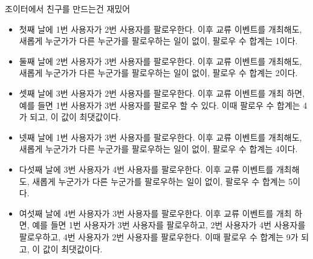 \begin{problem}{조이터에서 친구를 만드는건 재밌어}
\begin{itemize}
\item 첫째 날에 1번 사용자가 2번 사용자를 팔로우한다. 이후 교류 이벤트를 개최해도, 새롭게 누군가가 다른 누군가를 팔로우하는 일이 없이, 팔로우 수 합계는 1이다.
\item 둘째 날에 2번 사용자가 3번 사용자를 팔로우한다. 이후 교류 이벤트를 개최해도, 새롭게 누군가가 다른 누군가를 팔로우하는 일이 없이, 팔로우 수 합계는 2이다.
\item 셋째 날에 3번 사용자가 2번 사용자를 팔로우한다. 이후 교류 이벤트를 개최 하면, 예를 들면 1번 사용자가 3번 사용자를 팔로우 할 수 있다. 이때 팔로우 수 합계는 4가 되고, 이 값이 최댓값이다.
\item 넷째 날에 1번 사용자가 3번 사용자를 팔로우한다. 이후 교류 이벤트를 개최해도, 새롭게 누군가가 다른 누군가를 팔로우하는 일이 없이, 팔로우 수 합계는 4이다.
\item 다섯째 날에 3번 사용자가 4번 사용자를 팔로우한다. 이후 교류 이벤트를 개최해도, 새롭게 누군가가 다른 누군가를 팔로우하는 일이 없이, 팔로우 수 합계는 5이다.
\item 여섯째 날에 4번 사용자가 3번 사용자를 팔로우한다. 이후 교류 이벤트를 개최 하면, 예를 들면 1번 사용자가 3번 사용자를 팔로우하고, 2번 사용자가 4번 사용자를 팔로우하고, 4번 사용자가 2번 사용자를 팔로우한다. 이때 팔로우 수 합계는 9가 되고, 이 값이 최댓값이다.
\end{itemize}
\begin{example}
\end{example}

\end{problem}

